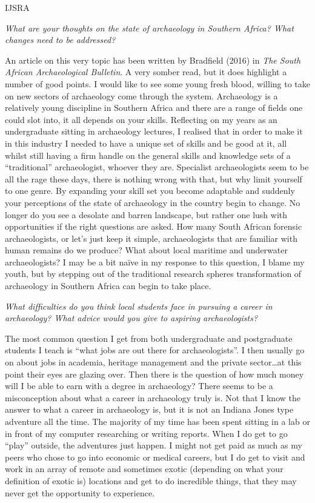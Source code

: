 \begin{labeling}{IJSRA}
\item[IJSRA] \emph{What are your thoughts on the state of archaeology in Southern Africa? What changes need to be addressed?}
	
\item[KM]
An article on this very topic has been written by Bradfield (2016) in \emph{The South African Archaeological Bulletin}. A very somber read, but it does highlight a number of good points. I would like to see some young fresh blood, willing to take on new sectors of archaeology come through the system.  Archaeology is a relatively young discipline in Southern Africa and there are a range of fields one could slot into, it all depends on your skills. Reflecting on my years as an undergraduate sitting in archaeology lectures, I realised that in order to make it in this industry I needed to have a unique set of skills and be good at it, all whilst still having a firm handle on the general skills and knowledge sets of a “traditional” archaeologist, whoever they are. Specialist archaeologists seem to be all the rage these days, there is nothing wrong with that, but why limit yourself to one genre. By expanding your skill set you become adaptable and suddenly your perceptions of the state of archaeology in the country begin to change. No longer do you see a desolate and barren landscape, but rather one lush with opportunities if the right questions are asked. How many South African forensic archaeologists, or let’s just keep it simple, archaeologists that are familiar with human remains do we produce? What about local maritime and underwater archaeologists?  I may be a bit naïve in my response to this question, I blame my youth, but by stepping out of the traditional research spheres transformation of archaeology in Southern Africa can begin to take place.

\item[IJSRA] \emph{What difficulties do you think local students face in pursuing a career in archaeology? What advice would you give to aspiring archaeologists?}
	
\item[KM]
The most common question I get from both undergraduate and postgraduate students I teach is “what jobs are out there for archaeologists”. I then usually go on about jobs in academia, heritage management and the private sector…at this point their eyes are glazing over. Then there is the question of how much money will I be able to earn with a degree in archaeology? There seems to be a misconception about what a career in archaeology truly is. Not that I know the answer to what a career in archaeology is, but it is not an Indiana Jones type adventure all the time. The majority of my time has been spent sitting in a lab or in front of my computer researching or writing reports. When I do get to go “play” outside, the adventures just happen. I might not get paid as much as my peers who chose to go into economic or medical careers, but I do get to visit and work in an array of remote and sometimes exotic (depending on what your definition of exotic is) locations and get to do incredible things, that they may never get the opportunity to experience.


\end{labeling}
